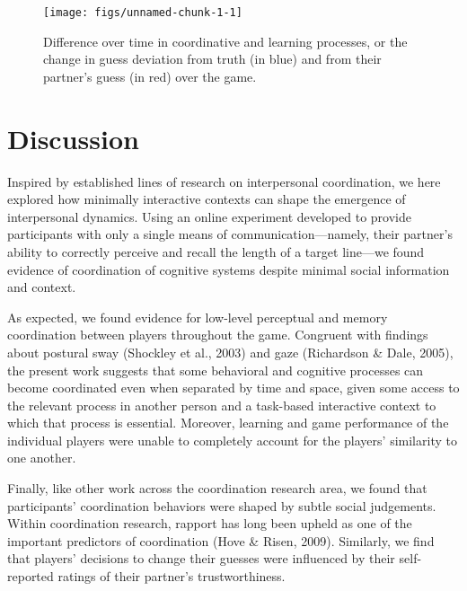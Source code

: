 \documentclass[10pt, letterpaper]{article}
\newenvironment{CodeChunk}{}{}
\begin{document}
\begin{CodeChunk}
\begin{figure}[H]

\texttt{[image: figs/unnamed-chunk-1-1]} \hfill{}

\caption[Difference over time in coordinative and learning processes, or the change in guess deviation from truth (in blue) and from their partner's guess (in red) over the game]{Difference over time in coordinative and learning processes, or the change in guess deviation from truth (in blue) and from their partner's guess (in red) over the game.}\label{fig:unnamed-chunk-1}
\end{figure}
\end{CodeChunk}

\section{Discussion}\label{discussion}

Inspired by established lines of research on interpersonal coordination,
we here explored how minimally interactive contexts can shape the
emergence of interpersonal dynamics. Using an online experiment
developed to provide participants with only a single means of
communication---namely, their partner's ability to correctly perceive
and recall the length of a target line---we found evidence of
coordination of cognitive systems despite minimal social information and
context.

As expected, we found evidence for low-level perceptual and memory
coordination between players throughout the game. Congruent with
findings about postural sway (Shockley et al., 2003) and gaze
(Richardson \& Dale, 2005), the present work suggests that some
behavioral and cognitive processes can become coordinated even when
separated by time and space, given some access to the relevant process
in another person and a task-based interactive context to which that
process is essential. Moreover, learning and game performance of the
individual players were unable to completely account for the players'
similarity to one another.

Finally, like other work across the coordination research area, we found
that participants' coordination behaviors were shaped by subtle social
judgements. Within coordination research, rapport has long been upheld
as one of the important predictors of coordination (Hove \& Risen,
2009). Similarly, we find that players' decisions to change their
guesses were influenced by their self-reported ratings of their
partner's trustworthiness.
\end{document}
